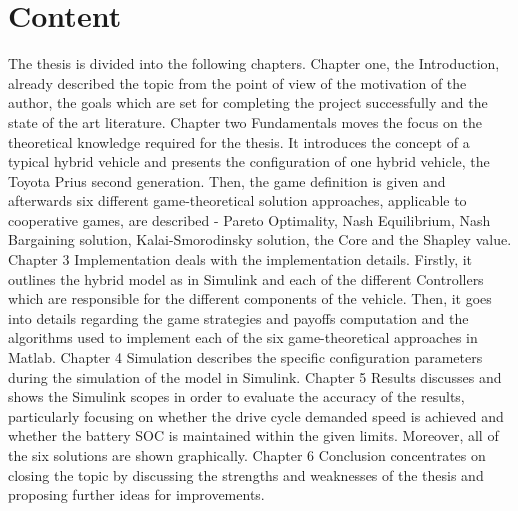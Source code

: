 \section{Content}
The thesis is divided into the following chapters. Chapter one, the Introduction, already described the topic from the point of view of the motivation of the author, the goals which are set for completing the project successfully and the state of the art literature. Chapter two Fundamentals moves the focus on the theoretical knowledge required for the thesis. It introduces the concept of a typical hybrid vehicle and presents the configuration of one hybrid vehicle, the Toyota Prius second generation. Then, the game definition is given and afterwards six different game-theoretical solution approaches, applicable to cooperative games, are described - Pareto Optimality, Nash Equilibrium, Nash Bargaining solution, Kalai-Smorodinsky solution, the Core and the Shapley value. Chapter 3 Implementation deals with the implementation details. Firstly, it outlines the hybrid model as in Simulink and each of the different Controllers which are responsible for the different components of the vehicle. Then, it goes into details regarding the game strategies and payoffs computation and the algorithms used to implement each of the six game-theoretical approaches in Matlab. Chapter 4 Simulation describes the specific configuration parameters during the simulation of the model in Simulink. Chapter 5 Results discusses and shows the Simulink scopes in order to evaluate the accuracy of the results, particularly focusing on whether the drive cycle demanded speed is achieved and whether the battery SOC is maintained within the given limits. Moreover, all of the six solutions are shown graphically. Chapter 6 Conclusion concentrates on closing the topic by discussing the strengths and weaknesses of the thesis and proposing further ideas for improvements.